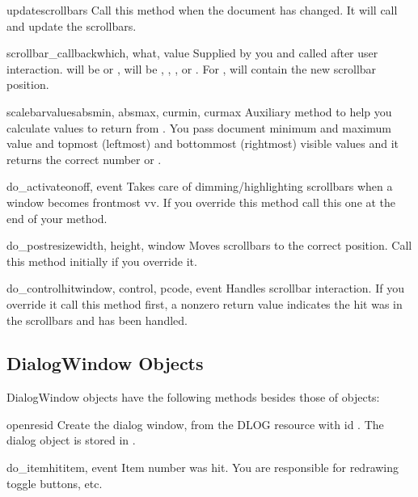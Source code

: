 \begin{funcdesc}{updatescrollbars}{}
Call this method when the document has changed. It will call
 and update the scrollbars.
\end{funcdesc}

\begin{funcdesc}{scrollbar_callback}{which, what, value}
Supplied by you and called after user interaction.  will
be  or ,  will be ,
, ,  or . For
,  will contain the new scrollbar position.
\end{funcdesc}

\begin{funcdesc}{scalebarvalues}{absmin, absmax, curmin, curmax}
Auxiliary method to help you calculate values to return from
. You pass document minimum and maximum value
and topmost (leftmost) and bottommost (rightmost) visible values and
it returns the correct number or .
\end{funcdesc}

\begin{funcdesc}{do_activate}{onoff, event}
Takes care of dimming/highlighting scrollbars when a window becomes
frontmost vv. If you override this method call this one at the end of
your method.
\end{funcdesc}

\begin{funcdesc}{do_postresize}{width, height, window}
Moves scrollbars to the correct position. Call this method initially
if you override it.
\end{funcdesc}

\begin{funcdesc}{do_controlhit}{window, control, pcode, event}
Handles scrollbar interaction. If you override it call this method
first, a nonzero return value indicates the hit was in the scrollbars
and has been handled.
\end{funcdesc}

\subsection{DialogWindow Objects}
\label{dialogwindow-objects}

DialogWindow objects have the following methods besides those of
 objects:


\begin{funcdesc}{open}{resid}
Create the dialog window, from the DLOG resource with id
. The dialog object is stored in .
\end{funcdesc}

\begin{funcdesc}{do_itemhit}{item, event}
Item number  was hit. You are responsible for redrawing
toggle buttons, etc.
\end{funcdesc}
